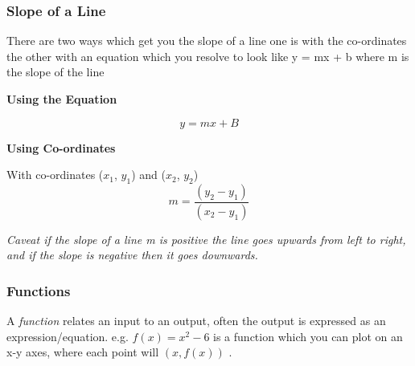 \documentclass{article}
\begin{document}
 
\newpage
\subsubsection{Slope of a Line}
There are two ways which get you the slope of a line one is with the co-ordinates the other with an equation which you resolve to look like y = mx + b where m is the slope of the line

\textbf{Using the Equation}

\begin{equation}
y = mx + B
\end{equation}

\textbf{Using Co-ordinates}

With co-ordinates ($x_1$, $y_1$) and ($x_2$, $y_2$) 
\begin{equation}
m = \frac{ (y_2 - y_1) }{ (x_2 - y_1) }
\end{equation}


\textit{Caveat if the slope of a line m is positive the line goes upwards from left to right, and if the slope is negative then it goes downwards.}

\subsubsection{Functions}
A \textit{function} relates an input to an output, often the output is expressed as an expression/equation.
e.g. $f(x) = x^2 - 6 $ is a function which you can plot on an x-y axes, where each point will $(x,f(x))$ . 
\end{document}
